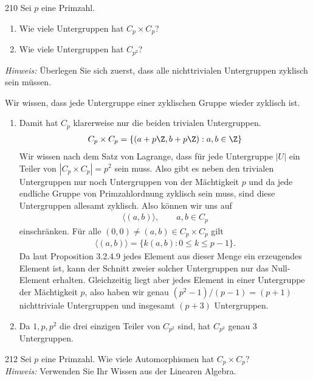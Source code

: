 \begin{algebraUE}{210}
Sei $p$ eine Primzahl.
\begin{enumerate}
  \item Wie viele Untergruppen hat $C_p \times C_p$?
  \item Wie viele Untergruppen hat $C_{p^2}$?
\end{enumerate}
\textit{Hinweis:} Überlegen Sie sich zuerst, dass alle nichttrivialen Untergruppen
zyklisch sein müssen.
\end{algebraUE}
\begin{solution}
Wir wissen, dass jede Untergruppe einer zyklischen Gruppe wieder zyklisch ist.
\begin{enumerate}
  \item Damit hat $C_p$ klarerweise nur die beiden trivialen Untergruppen.
  \begin{align*}
    C_p \times C_p = \{(a + p\Z, b + p\Z): a,b \in \Z\}
  \end{align*}
  Wir wissen nach dem Satz von Lagrange, dass für jede Untergruppe
  $|U|$ ein Teiler von $|C_p \times C_p| = p^2$ sein muss. Also gibt es neben den
  trivialen Untergruppen nur noch Untergruppen von der Mächtigkeit $p$ und da
  jede endliche Gruppe von Primzahlordnung zyklisch sein muss, sind diese
  Untergruppen allesamt zyklisch.
  Also können wir uns auf
  \begin{align*}
    \langle (a,b) \rangle, \qquad a,b \in C_p
  \end{align*}
  einschränken. Für alle $(0,0) \neq (a,b) \in C_p \times C_p$ gilt
  \begin{align*}
    \langle (a,b) \rangle = \{k(a,b): 0 \leq k \leq p-1\}.
  \end{align*}
  Da laut Proposition 3.2.4.9 jedes Element aus dieser Menge ein erzeugendes Element
  ist, kann der Schnitt zweier solcher Untergruppen nur das Null-Element erhalten.
  Gleichzeitig liegt aber jedes Element in einer Untergruppe der Mächtigkeit $p$,
  also haben wir genau $(p^2-1)/(p-1) = (p+1)$ nichttriviale Untergruppen
  und insgesamt $(p+3)$ Untergruppen.
  \item Da $1,p,p^2$ die drei einzigen Teiler von $C_{p^2}$ sind, hat
  $C_{p^2}$ genau 3 Untergruppen.
\end{enumerate}
\end{solution}
\begin{algebraUE}{212}
  Sei $p$ eine Primzahl. Wie viele Automorphismen hat $C_p \times C_p$? \\
  \textit{Hinweis:} Verwenden Sie Ihr Wissen aus der Linearen Algebra.
\end{algebraUE}
